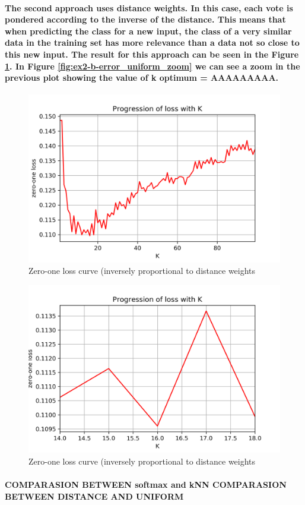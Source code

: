 \documentclass[a4paper]{article}    %
\begin{document}
\paragraph{The second approach uses distance weights. In this case, each vote is pondered according to the inverse of the distance. This means that when predicting the class for a new input, the class of a very similar data in the training set has more relevance than a data not so close to this new input. The result for this approach can be seen in the Figure \ref{fig:ex2-b-error_distance}. In Figure \ref{fig:ex2-b-error_uniform_zoom} we can see a zoom in the previous plot showing the value of k optimum = AAAAAAAAA.}
%
%
%
%
%
%
\begin{figure}[H]
    \centering
    \includegraphics[width=12cm]{error_distance}
    \caption{Zero-one loss curve (inversely proportional to distance weights}
    \label{fig:ex2-b-error_distance}
\end{figure}

\begin{figure}[H]
    \centering
    \includegraphics[width=12cm]{error_distance_(zoom)}
    \caption{Zero-one loss curve (inversely proportional to distance weights}
    \label{fig:ex2-b-error_distance_zoom}
\end{figure}

\paragraph{
COMPARASION BETWEEN softmax and kNN
COMPARASION BETWEEN DISTANCE AND UNIFORM
}

\end{document}
